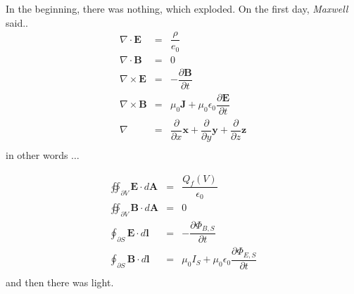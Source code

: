 
In the beginning, there was nothing, which exploded.
\vfill
On the first day, \emph{Maxwell} said..
\[
\begin{array}{rcl}
\nabla \cdot \textbf{E} &=& \dfrac{\rho}{e_0}\\
\nabla \cdot \textbf{B} &=& 0 \\ 
\nabla \times \textbf{E} &=& -\dfrac{\partial \textbf{B}}{\partial t}\\
\nabla \times \textbf{B} &=& \mu_0 \textbf{J} + \mu_0\epsilon_0 \dfrac{\partial
\textbf{E}}{\partial t}\\ 
\nabla &=& \dfrac{\partial}{\partial x}\textbf{x} +\dfrac{\partial} {\partial y}
\textbf{y}+\dfrac{\partial}{\partial z}\textbf{z}\\
\end{array}
\]
in other words $\ldots$

\[
\begin{array}{rcl}
\oiint_{\partial V}\textbf{E} \cdot d\textbf{A} &=& \dfrac{Q_f(V)}{\epsilon_0}\\
\oiint_{\partial V}\textbf{B} \cdot d\textbf{A} &=& 0\\
\oint_{\partial S}\textbf{E} \cdot d\textbf{l} &=& -\dfrac{\partial
\Phi_{B,S}}{\partial t}\\ 
\oint_{\partial S}\textbf{B} \cdot d\textbf{l} &=& \mu_0I_S + \mu_0 \epsilon_0
\dfrac{ \partial \Phi_{E,S}}{\partial t}\\

\end{array}
\]
and then there was light.

\vfill

